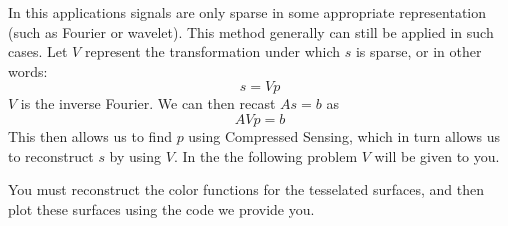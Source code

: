 In this applications signals are only sparse in some appropriate representation (such as Fourier or wavelet). This method generally can still be applied in such cases. Let $V$ represent the transformation under which $s$ is sparse, or in other words:
\begin{equation}
s = V p
\end{equation}
$V$ is the inverse Fourier. We can then recast $A s=b$ as
\begin{equation}
A V p = b
\end{equation}
This then allows us to find $p$ using Compressed Sensing, which in turn allows us to reconstruct $s$ by using $V$. In the the following problem $V$ will be given to you.

You must reconstruct the color functions
for the tesselated surfaces, and then plot these surfaces using the code we provide you.

%
%

